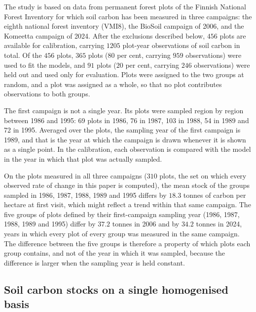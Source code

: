 \documentclass[11pt]{article}
\begin{document}
The study is based on data from permanent forest plots of the Finnish National Forest Inventory for
which soil carbon has been measured in three campaigns: the eighth national forest
inventory (VMI8), the BioSoil campaign of 2006, and the Komeetta campaign of 2024.
After the exclusions described below, $456$ plots are available for calibration,
carrying $1205$ plot-year observations of soil carbon in total. Of the $456$
plots, $365$ plots ($80$ per cent, carrying $959$ observations) were used to fit
the models, and $91$ plots ($20$ per cent, carrying $246$ observations) were held
out and used only for evaluation. Plots were assigned to the two groups at random,
and a plot was assigned as a whole, so that no plot contributes observations to
both groups.

The first campaign is not a single year. Its plots were sampled region by region
between 1986 and 1995: 69 plots in 1986, 76 in 1987, 103 in 1988, 54 in 1989 and
72 in 1995. Averaged over the plots, the sampling year of the first campaign is 1989,
and that is the year at which the campaign is drawn whenever it is shown as a single
point. In the calibration, each observation is compared with the model in the year in
which that plot was actually sampled.

On the plots measured in all three campaigns ($310$ plots, the set on which every
observed rate of change in this paper is computed), the mean stock of the groups sampled
in 1986, 1987, 1988, 1989 and 1995 differs by $18.3$ tonnes of carbon per hectare at
first visit, which might reflect a trend within that same campaign.
The five groups of plots defined by their first-campaign sampling year (1986, 1987,
1988, 1989 and 1995) differ by $37.2$ tonnes in 2006 and by $34.2$ tonnes in 2024,
years in which every plot of every group was measured in the same campaign. The
difference between the five groups is therefore a property of which plots each group
contains, and not of the year in which it was sampled, because the difference is
larger when the sampling year is held constant.

\subsection{Soil carbon stocks on a single homogenised basis}
\end{document}
